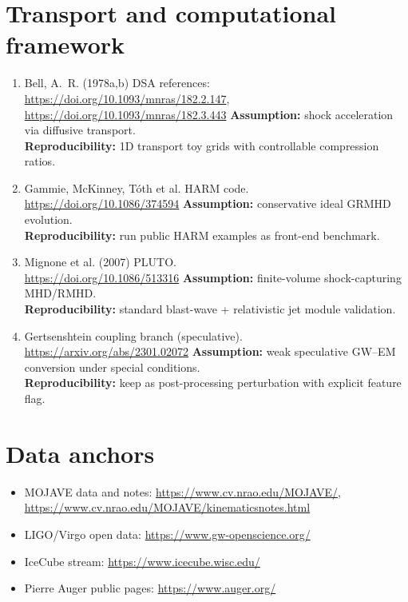 \documentclass[11pt]{article}
\begin{document}
\section{Transport and computational framework}
\begin{enumerate}
\item Bell, A.~R. (1978a,b) DSA references:\\
\url{https://doi.org/10.1093/mnras/182.2.147}, \url{https://doi.org/10.1093/mnras/182.3.443}
\textbf{Assumption:} shock acceleration via diffusive transport.\\
\textbf{Reproducibility:} 1D transport toy grids with controllable compression ratios.

\item Gammie, McKinney, T\'oth et al. HARM code.\\
\url{https://doi.org/10.1086/374594}
\textbf{Assumption:} conservative ideal GRMHD evolution.\\
\textbf{Reproducibility:} run public HARM examples as front-end benchmark.

\item Mignone et al. (2007) PLUTO.\\
\url{https://doi.org/10.1086/513316}
\textbf{Assumption:} finite-volume shock-capturing MHD/RMHD.\\
\textbf{Reproducibility:} standard blast-wave + relativistic jet module validation.

\item Gertsenshtein coupling branch (speculative).\\
\url{https://arxiv.org/abs/2301.02072}
\textbf{Assumption:} weak speculative GW--EM conversion under special conditions.\\
\textbf{Reproducibility:} keep as post-processing perturbation with explicit feature flag.
\end{enumerate}

\section{Data anchors}
\begin{itemize}
\item MOJAVE data and notes: \url{https://www.cv.nrao.edu/MOJAVE/}, \url{https://www.cv.nrao.edu/MOJAVE/kinematicsnotes.html}
\item LIGO/Virgo open data: \url{https://www.gw-openscience.org/}
\item IceCube stream: \url{https://www.icecube.wisc.edu/}
\item Pierre Auger public pages: \url{https://www.auger.org/}
\end{itemize}
\end{document}
